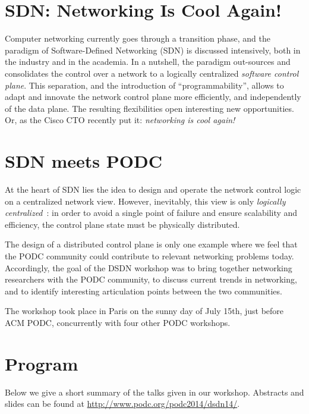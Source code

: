 \documentclass[11pt,pdftex,letter]{article}
\begin{document}
\section{SDN: Networking Is Cool Again!}

Computer networking currently goes through a transition phase,
and the paradigm of Software-Defined Networking (SDN)
is discussed intensively, both in the industry and in the academia. In
a nutshell, the paradigm out-sources and consolidates the control over a network
to a logically centralized \emph{software control plane}.
This separation, and the introduction of ``programmability'',
allows to adapt and innovate the network control plane more
efficiently, and independently of the data plane.
The resulting flexibilities open interesting new opportunities. Or, as the Cisco CTO recently put it:
\emph{networking is cool again!}

\section{SDN meets PODC}

At the heart of SDN lies the idea to design and operate
the network control logic
on a centralized network view.
However, inevitably, this view is only \emph{logically centralized}~\cite{onix,kandoo,hotsdn13loc,log-cent}:
in order to avoid a single point of failure and ensure scalability and efficiency,
the control plane state must
be physically distributed.

The design of a distributed control plane is only one example where we feel that the
PODC community could contribute to relevant networking problems today.
Accordingly, the goal of the DSDN workshop was to bring together networking researchers with the PODC
community, to discuss current trends in networking, and to identify interesting articulation
points between the two communities.

The workshop took
place in Paris on the sunny day of July 15th, just before
ACM PODC, concurrently with four other PODC workshops.

\section{Program}

Below we give a short summary of the talks given in our
workshop. Abstracts and slides can be found at \url{http://www.podc.org/podc2014/dsdn14/}.
\end{document}
